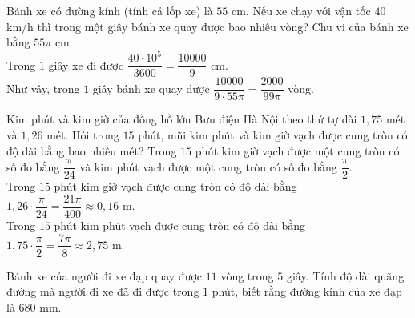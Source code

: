 \begin{bt}%

	Bánh xe có đường kính (tính cả lốp xe) là $55$ cm. Nếu xe chạy với vận tốc $40$ km/h thì trong một giây bánh xe quay được bao nhiêu vòng?
	\loigiai
	{
		Chu vi của bánh xe bằng $55\pi$ cm.\\
		Trong $1$ giây xe đi được $\dfrac{40\cdot 10^5}{3600} = \dfrac{10000}{9}$ cm.\\
		Như vây, trong $1$ giây bánh xe quay được $\dfrac{10000}{9 \cdot 55\pi} = \dfrac{2000}{99\pi}$ vòng.
	}
\end{bt}

\begin{bt}%

	Kim phút và kim giờ của đồng hồ lớn Bưu điện Hà Nội theo thứ tự dài $1{,}75$ mét và $1{,}26$ mét. Hỏi trong $15$ phút, mũi kim phút và kim giờ vạch được cung tròn có độ dài bằng bao nhiêu mét?
	\loigiai
	{
		Trong $15$ phút kim giờ vạch được một cung tròn có số đo bằng $\dfrac{\pi}{24}$ và kim phút vạch được một cung tròn có số đo bằng $\dfrac{\pi}{2}$.\\
		Trong $15$ phút kim giờ vạch được cung tròn có độ dài bằng $1{,}26\cdot \dfrac{\pi}{24} = \dfrac{21\pi}{400} \approx 0{,}16$ m.\\
		Trong $15$ phút kim phút vạch được cung tròn có độ dài bằng $1{,}75 \cdot \dfrac{\pi}{2} = \dfrac{7\pi}{8} \approx 2{,}75$ m.
	}
\end{bt}

\begin{bt}%

	Bánh xe của người đi xe đạp quay được $11$ vòng trong $5$ giây. Tính độ dài quãng đường mà người đi xe đã đi được trong $1$ phút, biết rằng đường kính của xe đạp là $680$ mm.
\end{bt}

